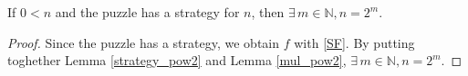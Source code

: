 \bigskip

\begin{theorem}
\label{puzzle_mp}
\leanok
If $0 < n$ and the puzzle has a strategy for $n$, then $\exists\, m\in\mathbb{N}, n = 2^m$.
\end{theorem}

\begin{proof}
  \leanok
{}
Since the puzzle has a strategy, we {\B obtain} $f$ with \eqref{SF}. By putting toghether {\B Lemma} \ref{strategy_pow2} and {\B Lemma} \ref{mul_pow2}, $\exists\,m\in\mathbb{N}, n = 2^m$.
\end{proof}
